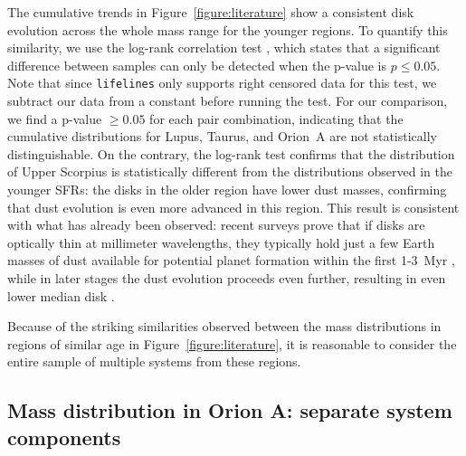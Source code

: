 \documentclass{aa}
\begin{document}
The cumulative trends in Figure~\ref{figure:literature} show a consistent disk evolution across the whole mass range for the younger regions. To quantify this similarity, we use the log-rank correlation test \citep{Feigelson85}, which states that a significant difference between samples can only be detected when the p-value is $p \leq 0.05$. Note that since \texttt{lifelines} only supports right censored data for this test, we subtract our data from a constant before running the test. For our comparison, we find a p-value $\geq 0.05$ for each pair combination, indicating that the cumulative distributions for Lupus, Taurus, and Orion~A are not statistically distinguishable. On the contrary, the log-rank test confirms that the distribution of Upper Scorpius is statistically different from the distributions observed in the younger SFRs: the disks in the older region have lower dust masses, confirming that dust evolution is even more advanced in this region. This result is consistent with what has already been observed: recent surveys prove that if disks are optically thin at millimeter wavelengths, they typically hold just a few Earth masses of dust available for potential planet formation within the first 1-3~Myr \citep[e.g.,][]{Ansdell18, Andrews13}, while in later stages the dust evolution proceeds even further, resulting in even lower median disk \citep[e.g.,][]{Barenfeld16}. \par
Because of the striking similarities observed between the mass distributions in regions of similar age in Figure~\ref{figure:literature}, it is reasonable to consider the entire sample of multiple systems from these regions.


\subsection{Mass distribution in Orion A: separate system components} \label{section:Single&Binary}
\end{document}
